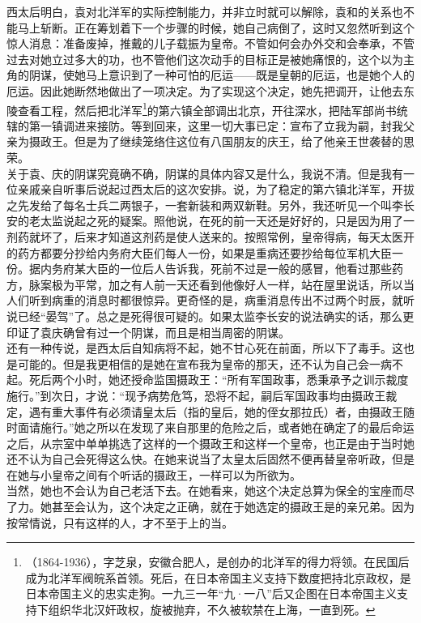 西太后明白，袁对北洋军的实际控制能力，并非立时就可以解除，袁和的关系也不能马上斩断。正在筹划着下一个步骤的时候，她自己病倒了，这时又忽然听到这个惊人消息：准备废掉，推戴的儿子载振为皇帝。不管如何会办外交和会奉承，不管过去对她立过多大的功，也不管他们这次动手的目标正是被她痛恨的，这个以为主角的阴谋，使她马上意识到了一种可怕的厄运——既是皇朝的厄运，也是她个人的厄运。因此她断然地做出了一项决定。为了实现这个决定，她先把调开，让他去东陵查看工程，然后把北洋军\footnote{（1864-1936），字芝泉，安徽合肥人，是创办的北洋军的得力将领。在民国后成为北洋军阀皖系首领。死后，在日本帝国主义支持下数度把持北京政权，是日本帝国主义的忠实走狗。一九三一年“九·一八”后又企图在日本帝国主义支持下组织华北汉奸政权，旋被抛弃，不久被软禁在上海，一直到死。}的第六镇全部调出北京，开往深水，把陆军部尚书统辖的第一镇调进来接防。等到回来，这里一切大事已定：宣布了立我为嗣，封我父亲为摄政王。但是为了继续笼络住这位有八国朋友的庆王，给了他亲王世袭替的思荣。\\

关于袁、庆的阴谋究竟确不确，阴谋的具体内容又是什么，我说不清。但是我有一位亲戚亲自听事后说起过西太后的这次安排。说，为了稳定的第六镇北洋军，开拔之先发给了每名士兵二两银子，一套新装和两双新鞋。另外，我还听见一个叫李长安的老太监说起之死的疑案。照他说，在死的前一天还是好好的，只是因为用了一剂药就坏了，后来才知道这剂药是使人送来的。按照常例，皇帝得病，每天太医开的药方都要分抄给内务府大臣们每人一份，如果是重病还要抄给每位军机大臣一份。据内务府某大臣的一位后人告诉我，死前不过是一般的感冒，他看过那些药方，脉案极为平常，加之有人前一天还看到他像好人一样，站在屋里说话，所以当人们听到病重的消息时都很惊异。更奇怪的是，病重消息传出不过两个时辰，就听说已经“晏驾”了。总之是死得很可疑的。如果太监李长安的说法确实的话，那么更印证了袁庆确曾有过一个阴谋，而且是相当周密的阴谋。\\

还有一种传说，是西太后自知病将不起，她不甘心死在前面，所以下了毒手。这也是可能的。但是我更相信的是她在宣布我为皇帝的那天，还不认为自己会一病不起。死后两个小时，她还授命监国摄政王：“所有军国政事，悉秉承予之训示裁度施行。”到次日，才说：“现予病势危笃，恐将不起，嗣后军国政事均由摄政王裁定，遇有重大事件有必须请皇太后（指的皇后，她的侄女那拉氏）者，由摄政王随时面请施行。”她之所以在发现了来自那里的危险之后，或者她在确定了的最后命运之后，从宗室中单单挑选了这样的一个摄政王和这样一个皇帝，也正是由于当时她还不认为自己会死得这么快。在她来说当了太皇太后固然不便再替皇帝听政，但是在她与小皇帝之间有个听话的摄政王，一样可以为所欲为。\\

当然，她也不会认为自己老活下去。在她看来，她这个决定总算为保全的宝座而尽了力。她甚至会认为，这个决定之正确，就在于她选定的摄政王是的亲兄弟。因为按常情说，只有这样的人，才不至于上的当。
